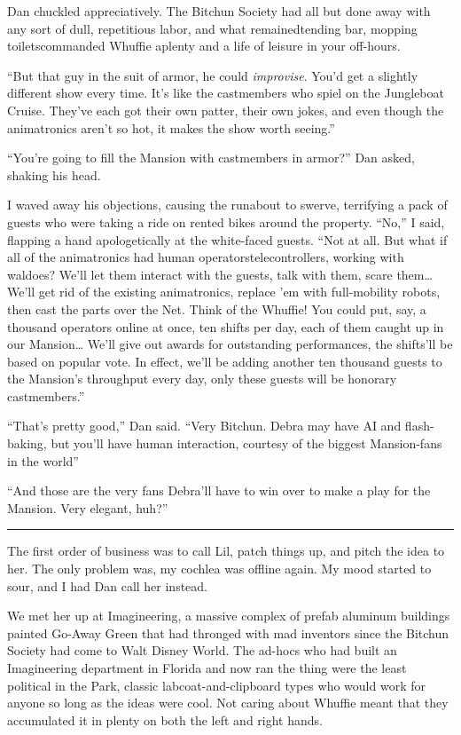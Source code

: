 Dan chuckled appreciatively. The Bitchun Society had all but done
away with any sort of dull, repetitious labor, and what
remained{\dash}tending bar, mopping toilets{\dash}commanded Whuffie aplenty and
a life of leisure in your off-hours.

“But that guy in the suit of armor, he could \emph{improvise}.
You'd get a slightly different show every time. It's like the
castmembers who spiel on the Jungleboat Cruise. They've each got
their own patter, their own jokes, and even though the animatronics
aren't so hot, it makes the show worth seeing.”

“You're going to fill the Mansion with castmembers in armor?” Dan
asked, shaking his head.

I waved away his objections, causing the runabout to swerve,
terrifying a pack of guests who were taking a ride on rented bikes
around the property. “No,” I said, flapping a hand apologetically
at the white-faced guests. “Not at all. But what if all of the
animatronics had human operators{\dash}telecontrollers, working with
waldoes? We'll let them interact with the guests, talk with them,
scare them… We'll get rid of the existing animatronics, replace 'em
with full-mobility robots, then cast the parts over the Net. Think
of the Whuffie! You could put, say, a thousand operators online at
once, ten shifts per day, each of them caught up in our Mansion…
We'll give out awards for outstanding performances, the shifts'll
be based on popular vote. In effect, we'll be adding another ten
thousand guests to the Mansion's throughput every day, only these
guests will be honorary castmembers.”

“That's pretty good,” Dan said. “Very Bitchun. Debra may have AI
and flash-baking, but you'll have human interaction, courtesy of
the biggest Mansion-fans in the world{\dash}”

“And those are the very fans Debra'll have to win over to make a
play for the Mansion. Very elegant, huh?”

\begin{center}\rule{3in}{0.4pt}\end{center}

The first order of business was to call Lil, patch things up, and
pitch the idea to her. The only problem was, my cochlea was offline
again. My mood started to sour, and I had Dan call her instead.

We met her up at Imagineering, a massive complex of prefab aluminum
buildings painted Go-Away Green that had thronged with mad
inventors since the Bitchun Society had come to Walt Disney World.
The ad-hocs who had built an Imagineering department in Florida and
now ran the thing were the least political in the Park, classic
labcoat-and-clipboard types who would work for anyone so long as
the ideas were cool. Not caring about Whuffie meant that they
accumulated it in plenty on both the left and right hands.

